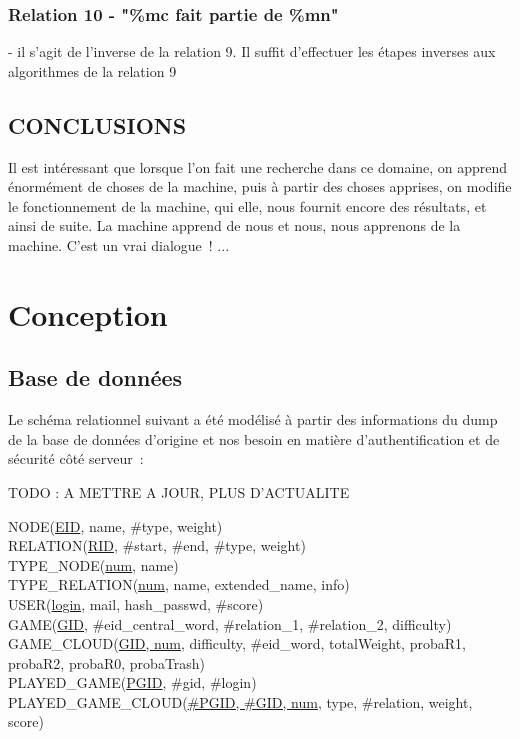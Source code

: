 \documentclass[a4paper,11pt,french]{article}
\begin{document}
\subsubsection{Relation 10 - "\%mc fait partie de \%mn"}
- il s'agit de l'inverse de la relation 9. Il suffit d'effectuer les étapes inverses aux algorithmes de la relation 9



\subsection{CONCLUSIONS}
Il est intéressant que lorsque l'on fait une recherche dans ce domaine, on apprend énormément de choses de la machine, puis à partir des choses apprises, on modifie le fonctionnement de la machine, qui elle, nous fournit encore des résultats, et ainsi de suite. La machine apprend de nous et nous, nous apprenons de la machine. C'est un vrai dialogue~! ... 








\section{Conception}


\subsection{Base de données}

Le schéma relationnel suivant a été modélisé à partir des informations du dump de la base de données d'origine et nos besoin en matière d'authentification et de sécurité côté serveur~:

TODO : A METTRE A JOUR, PLUS D'ACTUALITE

{\footnotesize
NODE(\underline{EID}, name, \#type, weight) \\ 
RELATION(\underline{RID}, \#start, \#end, \#type, weight) \\
TYPE\_NODE(\underline{num}, name) \\
TYPE\_RELATION(\underline{num}, name, extended\_name, info) \\
USER(\underline{login}, mail, hash\_passwd, \#score) \\
GAME(\underline{GID}, \#eid\_central\_word, \#relation\_1, \#relation\_2, difficulty) \\
GAME\_CLOUD(\underline{GID, num}, difficulty, \#eid\_word, totalWeight, probaR1, probaR2, probaR0, probaTrash) \\
PLAYED\_GAME(\underline{PGID}, \#gid, \#login) \\
PLAYED\_GAME\_CLOUD(\underline{\#PGID, \#GID, num}, type, \#relation, weight, score) 
}
\end{document}
